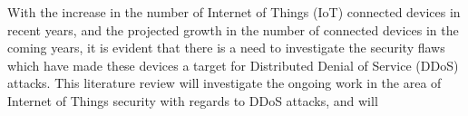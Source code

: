 With the increase in the number of Internet of Things (IoT) connected devices
in recent years, and the projected growth in the number of connected devices in
the coming years, it is evident that there is a need to investigate the
security flaws which have made these devices a target for Distributed Denial of
Service (DDoS) attacks. This literature review will investigate the ongoing
work in the area of Internet of Things security with regards to DDoS attacks,
and will
